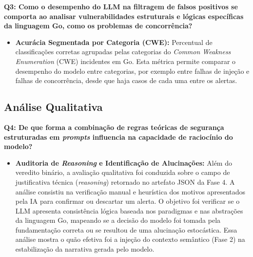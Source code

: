 \textbf{Q3: Como o desempenho do LLM na filtragem de falsos positivos se comporta ao analisar vulnerabilidades estruturais e lógicas específicas da linguagem Go, como os problemas de concorrência?}
\begin{itemize}
\item \textbf{Acurácia Segmentada por Categoria (CWE):} Percentual de classificações corretas agrupadas pelas categorias do \textit{Common Weakness Enumeration} (CWE) incidentes em Go. Esta métrica permite comparar o desempenho do modelo entre categorias, por exemplo entre falhas de injeção e falhas de concorrência, desde que haja casos de cada uma entre os alertas.
\end{itemize}

\subsection{Análise Qualitativa}

\textbf{Q4: De que forma a combinação de regras teóricas de segurança estruturadas em \textit{prompts} influencia na capacidade de raciocínio do modelo?}
\begin{itemize}
    \item \textbf{Auditoria de \textit{Reasoning} e Identificação de Alucinações:} Além do veredito binário, a avaliação qualitativa foi conduzida sobre o campo de justificativa técnica (\textit{reasoning}) retornado no artefato JSON da Fase 4. A análise consistiu na verificação manual e heurística dos motivos apresentados pela IA para confirmar ou descartar um alerta. O objetivo foi verificar se o LLM apresenta consistência lógica baseada nos paradigmas e nas abstrações da linguagem Go, mapeando se a decisão do modelo foi tomada pela fundamentação correta ou se resultou de uma alucinação estocástica. Essa análise mostra o quão efetiva foi a injeção do contexto semântico (Fase 2) na estabilização da narrativa gerada pelo modelo.
\end{itemize}

